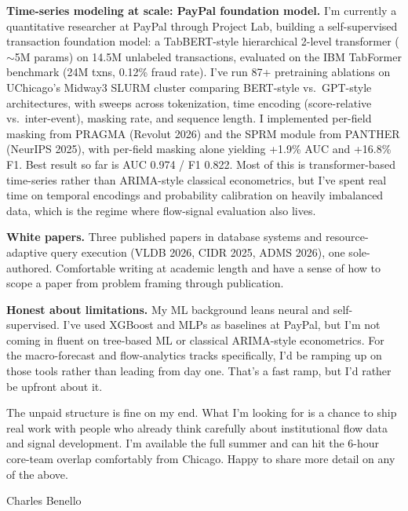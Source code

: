 \documentclass[letterpaper,11pt]{article}
\begin{document}
\textbf{Time-series modeling at scale: PayPal foundation model.} I'm currently a quantitative researcher at PayPal through Project Lab, building a self-supervised transaction foundation model: a TabBERT-style hierarchical 2-level transformer ($\sim$5M params) on 14.5M unlabeled transactions, evaluated on the IBM TabFormer benchmark (24M txns, 0.12\% fraud rate). I've run 87+ pretraining ablations on UChicago's Midway3 SLURM cluster comparing BERT-style vs.\ GPT-style architectures, with sweeps across tokenization, time encoding (score-relative vs.\ inter-event), masking rate, and sequence length. I implemented per-field masking from PRAGMA (Revolut 2026) and the SPRM module from PANTHER (NeurIPS 2025), with per-field masking alone yielding +1.9\% AUC and +16.8\% F1. Best result so far is AUC 0.974 / F1 0.822. Most of this is transformer-based time-series rather than ARIMA-style classical econometrics, but I've spent real time on temporal encodings and probability calibration on heavily imbalanced data, which is the regime where flow-signal evaluation also lives.

\textbf{White papers.} Three published papers in database systems and resource-adaptive query execution (VLDB 2026, CIDR 2025, ADMS 2026), one sole-authored. Comfortable writing at academic length and have a sense of how to scope a paper from problem framing through publication.

\textbf{Honest about limitations.} My ML background leans neural and self-supervised. I've used XGBoost and MLPs as baselines at PayPal, but I'm not coming in fluent on tree-based ML or classical ARIMA-style econometrics. For the macro-forecast and flow-analytics tracks specifically, I'd be ramping up on those tools rather than leading from day one. That's a fast ramp, but I'd rather be upfront about it.

The unpaid structure is fine on my end. What I'm looking for is a chance to ship real work with people who already think carefully about institutional flow data and signal development. I'm available the full summer and can hit the 6-hour core-team overlap comfortably from Chicago. Happy to share more detail on any of the above.

\vspace{4pt}

\noindent Charles Benello
\end{document}
